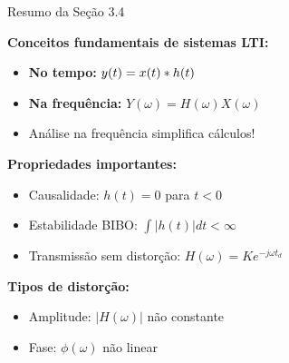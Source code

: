 
\begin{frame}{Resumo da Seção 3.4}

\textbf{Conceitos fundamentais de sistemas LTI:}

\begin{itemize}
\item \textbf{No tempo:} $y(t) = x(t) \ast h(t)$
\item \textbf{Na frequência:} $Y(\omega) = H(\omega) X(\omega)$
\item Análise na frequência simplifica cálculos!
\end{itemize}

\vspace{0.1cm}

\textbf{Propriedades importantes:}

\begin{itemize}
\item Causalidade: $h(t) = 0$ para $t < 0$
\item Estabilidade BIBO: $\int|h(t)|dt < \infty$
\item Transmissão sem distorção: $H(\omega) = Ke^{-j\omega t_d}$
\end{itemize}

\vspace{0.1cm}

\textbf{Tipos de distorção:}

\begin{itemize}
\item Amplitude: $|H(\omega)|$ não constante
\item Fase: $\phi(\omega)$ não linear
\end{itemize}


\end{frame}
